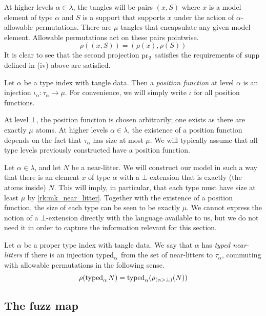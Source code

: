 At higher levels \( \alpha \in \lambda \), the tangles will be pairs \( (x, S) \) where \( x \) is a model element of type \( \alpha \) and \( S \) is a support that supports \( x \) under the action of \( \alpha \)-allowable permutations.
There are \( \mu \) tangles that encapsulate any given model element.
Allowable permutations act on these pairs pointwise.
\[ \rho((x, S)) = (\rho(x), \rho(S)) \]
It is clear to see that the second projection \( \operatorname{pr}_2 \) satisfies the requirements of \( \operatorname{supp} \) defined in (iv) above are satisfied.

\begin{definition}
    Let \( \alpha \) be a type index with tangle data.
    Then a \emph{position function} at level \( \alpha \) is an injection \( \iota_\alpha : \tau_\alpha \to \mu \).
    For convenience, we will simply write \( \iota \) for all position functions.
\end{definition}

At level \( \bot \), the position function is chosen arbitrarily; one exists as there are exactly \( \mu \) atoms.
At higher levels \( \alpha \in \lambda \), the existence of a position function depends on the fact that \( \tau_\alpha \) has size at most \( \mu \).
We will typically assume that all type levels previously constructed have a position function.

Let \( \alpha \in \lambda \), and let \( N \) be a near-litter.
We will construct our model in such a way that there is an element \( x \) of type \( \alpha \) with a \( \bot \)-extension that is exactly (the atoms inside) \( N \).
This will imply, in particular, that each type must have size at least \( \mu \) by \cref{rk:mk_near_litter}.
Together with the existence of a position function, the size of each type can be seen to be exactly \( \mu \).
We cannot express the notion of a \( \bot \)-extension directly with the language available to us, but we do not need it in order to capture the information relevant for this section.

\begin{definition}
    Let \( \alpha \) be a proper type index with tangle data.
    We say that \( \alpha \) has \emph{typed near-litters} if there is an injection \( \operatorname{typed}_\alpha \) from the set of near-litters to \( \tau_\alpha \), commuting with allowable permutations in the following sense.
    \[ \rho(\operatorname{typed}_\alpha N) = \operatorname{typed}_\alpha (\rho_{(\alpha > \bot)}(N)) \]
\end{definition}

\subsection{The fuzz map}

